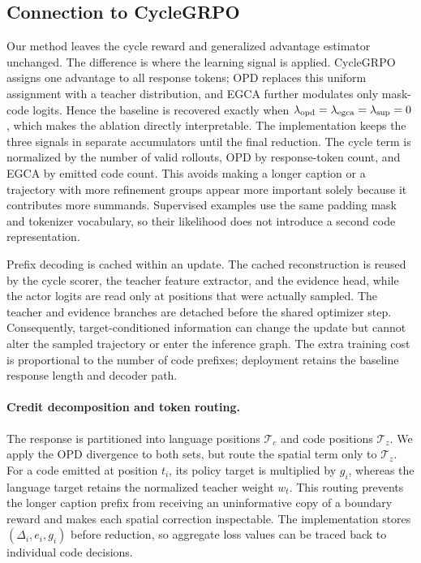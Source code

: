\documentclass{article}
\begin{document}
\subsection{Connection to CycleGRPO}Our method leaves the cycle reward and generalized advantage estimator unchanged. The difference is where the learning signal is applied. CycleGRPO assigns one advantage to all response tokens; OPD replaces this uniform assignment with a teacher distribution, and EGCA further modulates only mask-code logits. Hence the baseline is recovered exactly when $\lambda_{\rm opd}=\lambda_{\rm egca}=\lambda_{\rm sup}=0$, which makes the ablation directly interpretable.
The implementation keeps the three signals in separate accumulators until the final reduction. The cycle term is normalized by the number of valid rollouts, OPD by response-token count, and EGCA by emitted code count. This avoids making a longer caption or a trajectory with more refinement groups appear more important solely because it contributes more summands. Supervised examples use the same padding mask and tokenizer vocabulary, so their likelihood does not introduce a second code representation.

Prefix decoding is cached within an update. The cached reconstruction is reused by the cycle scorer, the teacher feature extractor, and the evidence head, while the actor logits are read only at positions that were actually sampled. The teacher and evidence branches are detached before the shared optimizer step. Consequently, target-conditioned information can change the update but cannot alter the sampled trajectory or enter the inference graph. The extra training cost is proportional to the number of code prefixes; deployment retains the baseline response length and decoder path.
\paragraph{Credit decomposition and token routing.}The response is partitioned into language positions $\mathcal T_c$ and code positions $\mathcal T_z$. We apply the OPD divergence to both sets, but route the spatial term only to $\mathcal T_z$. For a code emitted at position $t_i$, its policy target is multiplied by $g_i$, whereas the language target retains the normalized teacher weight $w_t$. This routing prevents the longer caption prefix from receiving an uninformative copy of a boundary reward and makes each spatial correction inspectable. The implementation stores $(\Delta_i,e_i,g_i)$ before reduction, so aggregate loss values can be traced back to individual code decisions.
\end{document}
